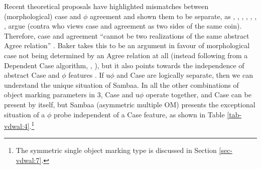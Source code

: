 \documentclass[output=paper
,modfonts
,nonflat]{langsci/langscibook}
\begin{document}
\begin{figure}[!h]
\begin{exe}
\end{exe} \vspace{-1cm}
\end{figure} \noindent
Recent theoretical proposals have highlighted mismatches between (morphological) case and $\phi$ agreement and shown them to be separate, as \citet{Bhatt2005}, \citet{Baker2008a},  \citet{Baker2008b}, \citet{Baker2012}, \citet{Baker2015}, \citet{Bobaljik2008}, \citet{Barany2015}, \citet{StegovecTA}
argue (contra \citealt{Chomsky2000, Chomsky2001} who views case and agreement as two sides of the same coin). Therefore, case and agreement “cannot be two realizations of the same abstract Agree relation” \citep[272 on Amharic]{Baker2012}. Baker takes this to be an argument in favour of morphological case not being determined by an Agree relation at all (instead following from a Dependent Case algorithm, \citealt{Marantz1991}, \citealt{Baker2015}), but it also points towards the independence of abstract Case and $\phi$ features \citep{Keine2010, Barany2015}. If u$\phi$ and Case are logically separate, then we can understand the unique situation of Sambaa. In all the other combinations of object marking parameters in 3, Case and u$\phi$ operate together, and Case can be present by itself, but Sambaa (asymmetric multiple OM) presents the exceptional situation of a $\phi$ probe independent of a Case feature, as shown in Table \ref{tab-vdwal:4}.\footnote{The symmetric single object marking type is discussed in Section \ref{sec-vdwal:7}.}
\end{document}
